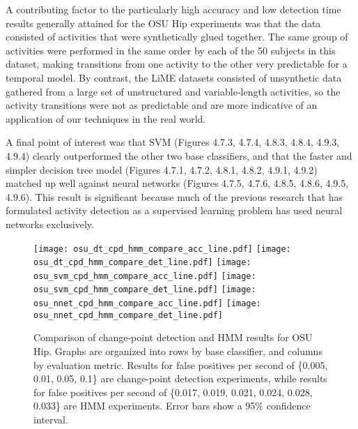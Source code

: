 A contributing factor to the particularly high accuracy and low detection time
results generally attained for the OSU Hip experiments was that the data
consisted of activities that were synthetically glued together. The same group
of activities were performed in the same order by each of the 50 subjects in
this dataset, making transitions from one activity to the other very predictable
for a temporal model. By contrast, the LiME datasets consisted of unsynthetic
data gathered from a large set of unstructured and variable-length activities,
so the activity transitions were not as predictable and are more indicative of
an application of our techniques in the real world.


A final point of interest was that SVM (Figures 4.7.3, 4.7.4, 4.8.3, 4.8.4, 4.9.3, 4.9.4) clearly outperformed the other two
base classifiers, and that the faster and simpler decision tree model (Figures 4.7.1, 4.7.2, 4.8.1, 4.8.2, 4.9.1, 4.9.2) matched up
well against neural networks (Figures 4.7.5, 4.7.6, 4.8.5, 4.8.6, 4.9.5, 4.9.6). This result is significant because much of the
previous research that has formulated activity detection as a supervised learning
problem has used neural networks exclusively.

\begin{figure}[h]
 \centering
 \texttt{[image: osu\_dt\_cpd\_hmm\_compare\_acc\_line.pdf]} \hspace{1em}\vspace{1em}
 \texttt{[image: osu\_dt\_cpd\_hmm\_compare\_det\_line.pdf]} 
 \texttt{[image: osu\_svm\_cpd\_hmm\_compare\_acc\_line.pdf]} \hspace{1em}\vspace{1em}
 \texttt{[image: osu\_svm\_cpd\_hmm\_compare\_det\_line.pdf]}
 \texttt{[image: osu\_nnet\_cpd\_hmm\_compare\_acc\_line.pdf]} \hspace{1em}
 \texttt{[image: osu\_nnet\_cpd\_hmm\_compare\_det\_line.pdf]}
 \caption{Comparison of change-point detection and HMM results for OSU Hip.
  Graphs are organized into rows by base classifier, and columns by evaluation
  metric. Results for false positives per second of \{0.005, 0.01, 0.05, 0.1\} are change-point
  detection experiments, while results for false positives per second of
  \{0.017, 0.019, 0.021, 0.024, 0.028, 0.033\} are HMM experiments. Error bars
  show a 95\% confidence interval.}
 \label{fig:osu_compare_cpd_hmm}
\end{figure}

